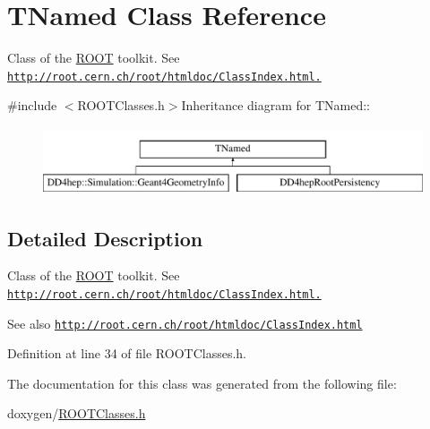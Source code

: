 \hypertarget{class_t_named}{
\section{TNamed Class Reference}
\label{class_t_named}
}


Class of the \hyperlink{namespace_r_o_o_t}{ROOT} toolkit. See \href{http://root.cern.ch/root/htmldoc/ClassIndex.html.}{\tt http://root.cern.ch/root/htmldoc/ClassIndex.html.}  


{\ttfamily \#include $<$ROOTClasses.h$>$}Inheritance diagram for TNamed::\begin{figure}[H]
\begin{center}
\leavevmode
\includegraphics[height=2cm]{class_t_named}
\end{center}
\end{figure}


\subsection{Detailed Description}
Class of the \hyperlink{namespace_r_o_o_t}{ROOT} toolkit. See \href{http://root.cern.ch/root/htmldoc/ClassIndex.html.}{\tt http://root.cern.ch/root/htmldoc/ClassIndex.html.} \begin{DoxySeeAlso}{See also}
\href{http://root.cern.ch/root/htmldoc/ClassIndex.html}{\tt http://root.cern.ch/root/htmldoc/ClassIndex.html} 
\end{DoxySeeAlso}


Definition at line 34 of file ROOTClasses.h.

The documentation for this class was generated from the following file:\begin{DoxyCompactItemize}
\item 
doxygen/\hyperlink{_r_o_o_t_classes_8h}{ROOTClasses.h}\end{DoxyCompactItemize}
